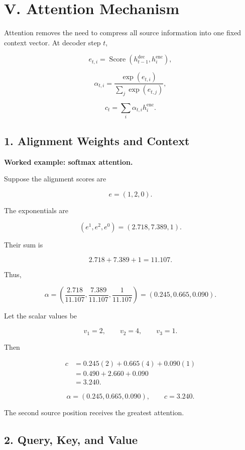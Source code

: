 \documentclass[11pt,a4paper,twoside]{article}
\begin{document}
\section*{V. Attention Mechanism}

Attention removes the need to compress all source information into one fixed context vector. At decoder step $t$,

\[
e_{t,i}=\operatorname{Score}(h_{t-1}^{\mathrm{dec}},h_i^{\mathrm{enc}}),
\]

\[
\boxed{
\alpha_{t,i}=\frac{\exp(e_{t,i})}{\sum_j\exp(e_{t,j})}
},
\]

\[
\boxed{
c_t=\sum_i\alpha_{t,i}h_i^{\mathrm{enc}}
}.
\]

\subsection*{1. Alignment Weights and Context}

\textbf{Worked example: softmax attention.}

Suppose the alignment scores are

\[
e=(1,2,0).
\]

The exponentials are

\[
(e^1,e^2,e^0)=(2.718,7.389,1).
\]

Their sum is

\[
2.718+7.389+1=11.107.
\]

Thus,

\[
\alpha=\left(
\frac{2.718}{11.107},
\frac{7.389}{11.107},
\frac{1}{11.107}
\right)
=(0.245,0.665,0.090).
\]

Let the scalar values be

\[
v_1=2,
\qquad v_2=4,
\qquad v_3=1.
\]

Then

\[
\begin{aligned}
c
&=0.245(2)+0.665(4)+0.090(1)\\
&=0.490+2.660+0.090\\
&=3.240.
\end{aligned}
\]

\[
\boxed{\alpha=(0.245,0.665,0.090),\qquad c=3.240.}
\]

The second source position receives the greatest attention.

\subsection*{2. Query, Key, and Value}
\end{document}
